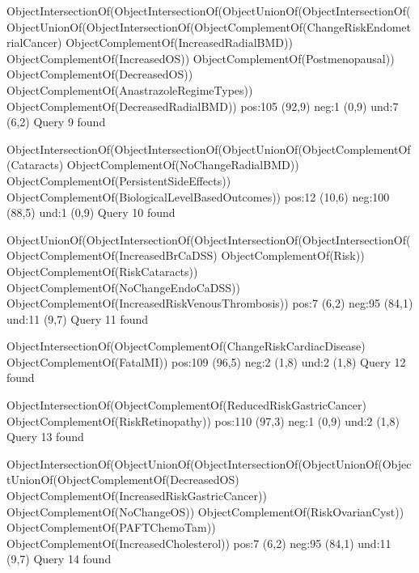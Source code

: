 ObjectIntersectionOf(ObjectIntersectionOf(ObjectUnionOf(ObjectIntersectionOf(ObjectUnionOf(ObjectIntersectionOf(ObjectComplementOf(ChangeRiskEndometrialCancer) ObjectComplementOf(IncreasedRadialBMD)) ObjectComplementOf(IncreasedOS)) ObjectComplementOf(Postmenopausal)) ObjectComplementOf(DecreasedOS)) ObjectComplementOf(AnastrazoleRegimeTypes)) ObjectComplementOf(DecreasedRadialBMD))
pos:105 (92,9)		 neg:1 (0,9)		 und:7 (6,2)
Query 9 found

ObjectIntersectionOf(ObjectIntersectionOf(ObjectUnionOf(ObjectComplementOf(Cataracts) ObjectComplementOf(NoChangeRadialBMD)) ObjectComplementOf(PersistentSideEffects)) ObjectComplementOf(BiologicalLevelBasedOutcomes))
pos:12 (10,6)  neg:100 (88,5)		 	und:1 (0,9)
Query 10 found

ObjectUnionOf(ObjectIntersectionOf(ObjectIntersectionOf(ObjectIntersectionOf(ObjectComplementOf(IncreasedBrCaDSS) ObjectComplementOf(Risk)) ObjectComplementOf(RiskCataracts)) ObjectComplementOf(NoChangeEndoCaDSS)) ObjectComplementOf(IncreasedRiskVenousThrombosis))
pos:7 (6,2)        neg:95 (84,1)		 		und:11 (9,7)
Query 11 found

ObjectIntersectionOf(ObjectComplementOf(ChangeRiskCardiacDisease) ObjectComplementOf(FatalMI))
pos:109 (96,5)		 neg:2 (1,8)		 und:2 (1,8)
Query 12 found

ObjectIntersectionOf(ObjectComplementOf(ReducedRiskGastricCancer) ObjectComplementOf(RiskRetinopathy))
pos:110 (97,3)		 neg:1 (0,9)		 und:2 (1,8)
Query 13 found

ObjectIntersectionOf(ObjectUnionOf(ObjectIntersectionOf(ObjectUnionOf(ObjectUnionOf(ObjectComplementOf(DecreasedOS) ObjectComplementOf(IncreasedRiskGastricCancer)) ObjectComplementOf(NoChangeOS)) ObjectComplementOf(RiskOvarianCyst)) ObjectComplementOf(PAFTChemoTam)) ObjectComplementOf(IncreasedCholesterol))
pos:7 (6,2)        neg:95 (84,1)		 		und:11 (9,7)
Query 14 found
